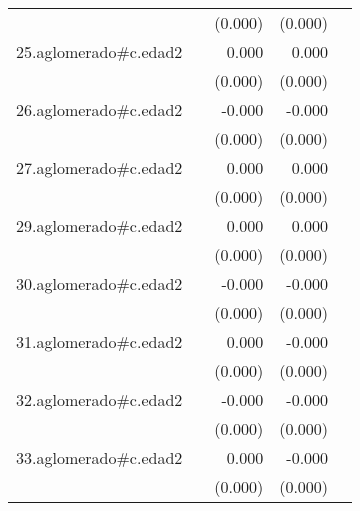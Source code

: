 {\begin{longtable}{l*{4}{D{.}{.}{-1}}}
            &                     &     (0.000)         &     (0.000)         &                     \\
\addlinespace
25.aglomerado#c.edad2&                     &       0.000         &       0.000         &                     \\
            &                     &     (0.000)         &     (0.000)         &                     \\
\addlinespace
26.aglomerado#c.edad2&                     &      -0.000         &      -0.000\sym{**} &                     \\
            &                     &     (0.000)         &     (0.000)         &                     \\
\addlinespace
27.aglomerado#c.edad2&                     &       0.000\sym{**} &       0.000         &                     \\
            &                     &     (0.000)         &     (0.000)         &                     \\
\addlinespace
29.aglomerado#c.edad2&                     &       0.000\sym{**} &       0.000         &                     \\
            &                     &     (0.000)         &     (0.000)         &                     \\
\addlinespace
30.aglomerado#c.edad2&                     &      -0.000         &      -0.000\sym{***}&                     \\
            &                     &     (0.000)         &     (0.000)         &                     \\
\addlinespace
31.aglomerado#c.edad2&                     &       0.000         &      -0.000\sym{***}&                     \\
            &                     &     (0.000)         &     (0.000)         &                     \\
\addlinespace
32.aglomerado#c.edad2&                     &      -0.000         &      -0.000\sym{***}&                     \\
            &                     &     (0.000)         &     (0.000)         &                     \\
\addlinespace
33.aglomerado#c.edad2&                     &       0.000         &      -0.000\sym{***}&                     \\
            &                     &     (0.000)         &     (0.000)         &                     \\

\end{longtable}}
